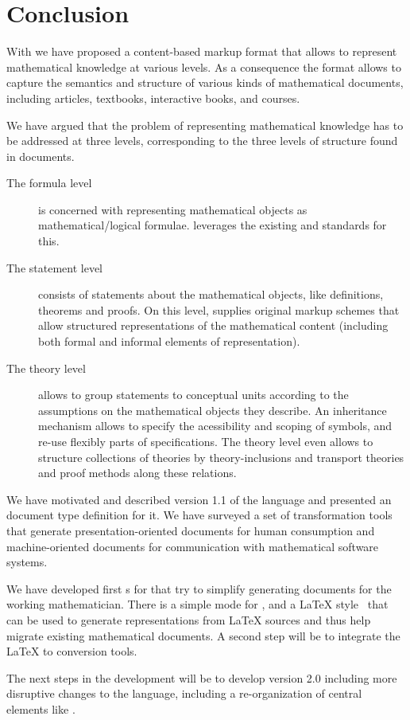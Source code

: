 \chapter{Conclusion}\label{sec:concl}\label{sec:future}

With {\omdoc} we have proposed a content-based markup format that
allows to represent mathematical knowledge at various levels. As a
consequence the format allows to capture the semantics and structure
of various kinds of mathematical documents, including articles,
textbooks, interactive books, and courses. 

We have argued that the problem of representing mathematical knowledge
has to be addressed at three levels, corresponding to the three levels
of structure found in documents.
\begin{description}
\item[The formula level] is concerned with representing mathematical objects as
  mathematical/logical formulae. {\omdoc} leverages the existing {\openmath} and
  {\mathml} standards for this.
\item[The statement level] consists of statements about the mathematical objects,
  like definitions, theorems and proofs. On this level, {\omdoc} supplies original
  markup schemes that allow structured representations of the mathematical content
  (including both formal and informal elements of representation).
\item[The theory level] allows to group statements to conceptual units according
  to the assumptions on the mathematical objects they describe. An inheritance
  mechanism allows to specify the acessibility and scoping of symbols, and re-use
  flexibly parts of specifications. The theory level even allows to structure
  collections of theories by theory-inclusions and transport theories and proof
  methods along these relations.
\end{description}
We have motivated and described version 1.1 of the {\omdoc} language
and presented an {\xml} document type definition for it. We have
surveyed a set of transformation tools that generate
presentation-oriented documents for human consumption and
machine-oriented documents for communication with mathematical
software systems.

We have developed first {s} for {\omdoc} that
try to simplify generating {\omdoc} documents for the working
mathematician. There is a simple {\omdoc} mode for {}, and
a {\LaTeX} style~\cite{Kohlhase:corfl00} that can be used to generate
{\omdoc} representations from {\LaTeX} sources and thus help migrate
existing mathematical documents. A second step will be to integrate
the {\LaTeX} to {\openmath} conversion tools. 

The next steps in the development will be to develop {\omdoc} version
2.0 including more disruptive changes to the language, including a
re-organization of central {\omdoc} elements like
{}.


